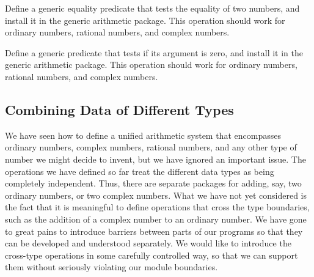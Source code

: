 \begin{exercise}
	\label{Exercise 2.79}
	Define a generic equality predicate  that tests the equality of two numbers, and install it in the generic arithmetic package.
	This operation should work for ordinary numbers, rational numbers, and complex numbers.
\end{exercise}



\begin{exercise}
	\label{Exercise 2.80}
	Define a generic predicate  that tests if its argument is zero, and install it in the generic arithmetic package.
	This operation should work for ordinary numbers, rational numbers, and complex numbers.
\end{exercise}



\subsection{Combining Data of Different Types}
\label{Section 2.5.2}

We have seen how to define a unified arithmetic system that encompasses ordinary numbers, complex numbers, rational numbers, and any other type of number we might decide to invent, but we have ignored an important issue.
The operations we have defined so far treat the different data types as being completely independent.
Thus, there are separate packages for adding, say, two ordinary numbers, or two complex numbers.
What we have not yet considered is the fact that it is meaningful to define operations that cross the type boundaries, such as the addition of a complex number to an ordinary number.
We have gone to great pains to introduce barriers between parts of our programs so that they can be developed and understood separately.
We would like to introduce the cross-type operations in some carefully controlled way, so that we can support them without seriously violating our module boundaries.

